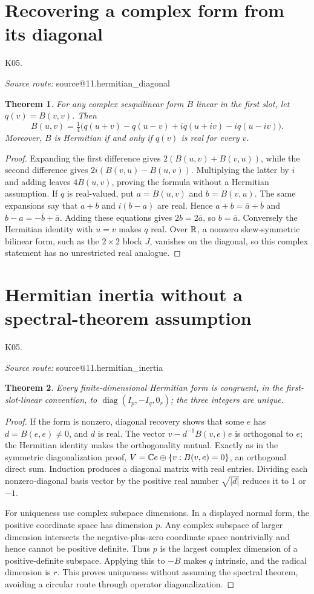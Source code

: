 \documentclass[11pt,a4paper]{book}
\makeatletter
\newtheorem{theorem}{Theorem}[chapter]
\theoremstyle{definition}\newtheorem{definition}[theorem]{Definition}
\theoremstyle{remark}\newtheorem{remark}[theorem]{Remark}
\DeclareMathOperator{\diag}{diag}\DeclareMathOperator{\id}{id}
\newcommand{\abs}[1]{\lvert #1\rvert}
\newcommand{\Kentry}[2]{\section{#2}\label{k:#1}\noindent\textsf{\small K05.\detokenize{#1}}\par
  \begingroup\small\color{black!65}\textit{Source route: }\csname source@#1\endcsname\par\endgroup}
\makeatother
\begin{document}
\Kentry{11.hermitian_diagonal}{Recovering a complex form from its diagonal}
\begin{theorem}
For any complex sesquilinear form $B$ linear in the first slot, let $q(v)=B(v,v)$. Then
\[
 B(u,v)=\tfrac14\bigl(q(u+v)-q(u-v)+i q(u+iv)-i q(u-iv)\bigr).
\]
Moreover, $B$ is Hermitian if and only if $q(v)$ is real for every $v$.
\end{theorem}
\begin{proof}
Expanding the first difference gives $2(B(u,v)+B(v,u))$, while the second difference gives $2i(B(v,u)-B(u,v))$. Multiplying the latter by $i$ and adding leaves $4B(u,v)$, proving the formula without a Hermitian assumption. If $q$ is real-valued, put $a=B(u,v)$ and $b=B(v,u)$. The same expansions say that $a+b$ and $i(b-a)$ are real. Hence $a+b=\overline a+\overline b$ and $b-a=-\overline b+\overline a$. Adding these equations gives $2b=2\overline a$, so $b=\overline a$. Conversely the Hermitian identity with $u=v$ makes $q$ real. Over $\mathbb R$, a nonzero skew-symmetric bilinear form, such as the $2\times2$ block $J$, vanishes on the diagonal, so this complex statement has no unrestricted real analogue.
\end{proof}

\Kentry{11.hermitian_inertia}{Hermitian inertia without a spectral-theorem assumption}
\begin{theorem}
Every finite-dimensional Hermitian form is congruent, in the first-slot-linear convention, to $\diag(I_p,-I_q,0_r)$; the three integers are unique.
\end{theorem}
\begin{proof}
If the form is nonzero, diagonal recovery shows that some $e$ has $d=B(e,e)\ne0$, and $d$ is real. The vector $v-d^{-1}B(v,e)e$ is orthogonal to $e$; the Hermitian identity makes the orthogonality mutual. Exactly as in the symmetric diagonalization proof, $V=\mathbb C e\oplus\{v:B(v,e)=0\}$, an orthogonal direct sum. Induction produces a diagonal matrix with real entries. Dividing each nonzero-diagonal basis vector by the positive real number $\sqrt{\abs d}$ reduces it to $1$ or $-1$.

For uniqueness use complex subspace dimensions. In a displayed normal form, the positive coordinate space has dimension $p$. Any complex subspace of larger dimension intersects the negative-plus-zero coordinate space nontrivially and hence cannot be positive definite. Thus $p$ is the largest complex dimension of a positive-definite subspace. Applying this to $-B$ makes $q$ intrinsic, and the radical dimension is $r$. This proves uniqueness without assuming the spectral theorem, avoiding a circular route through operator diagonalization.
\end{proof}
\end{document}
